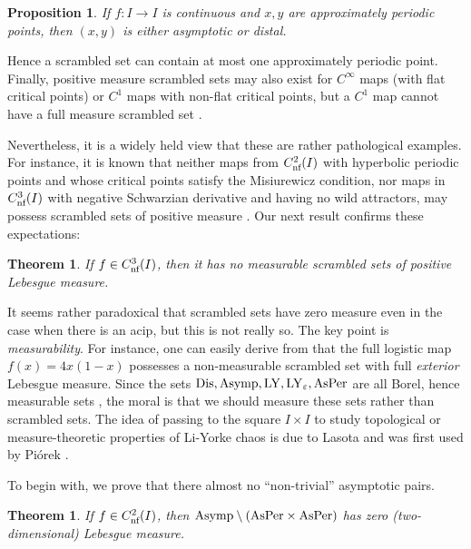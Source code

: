 \documentclass[12pt, psamsfonts, reqno]{amsart}
\newcounter{letter}
\newtheorem{maintheorem}[letter]{Theorem}
\newtheorem{proposition}[theorem]{Proposition}
\begin{document}
\begin{proposition}\label{prop:approximately}
If $f:I\to I$ is continuous and $x,y$ are approximately periodic
 points, then $(x,y)$ is either asymptotic or distal.
\end{proposition}

\noindent Hence a scrambled set can contain at most one
approximately periodic point. Finally, positive measure scrambled
sets may also exist for $C^\infty$ maps (with flat critical
points) or $C^1$ maps with non-flat critical points, but a $C^1$
map cannot have a full measure scrambled set \cite{Jim1, Jim2,
BaJi2}.

Nevertheless, it is a widely held view that
these are rather pathological examples. For instance, it is known
that neither maps from ${C^2_{\text{\rm nf}}}(I)$ with hyperbolic periodic points
and whose critical points satisfy the Misiurewicz condition, nor
maps in ${C^3_{\text{\rm nf}}}(I)$ with negative Schwarzian derivative and
having no wild attractors, may possess scrambled sets of positive
measure \cite{BaJi1, BrJi}. Our next result confirms these expectations:

\begin{maintheorem} \label{mainthmC2}
 If $f\in {C^3_{\text{\rm nf}}}(I)$, then it has
 no measurable scrambled sets of positive Lebesgue measure.
\end{maintheorem}

It seems rather paradoxical that scrambled sets have zero measure
even in the case when there is an acip, but this is not really so.
The key point is \emph{measurability}. For instance, one can
easily derive from \cite{Smi1} that the full logistic map
$f(x)=4x(1-x)$ possesses a non-measurable scrambled set with full
\emph{exterior} Lebesgue measure. Since the sets ${\mathop{\rm Dis}\nolimits}, {\mathop{\rm Asymp}\nolimits},
{\mathop{\rm LY}\nolimits}, {\mathop{\rm LY}\nolimits}_{\varepsilon}, {\mathop{\rm AsPer}\nolimits}$ are all Borel, hence measurable sets
\cite{Jim3, BrJi}, the moral is that we should measure these sets
rather than scrambled sets. The idea of passing to the square $I
\times I$ to study topological or measure-theoretic properties of
Li-Yorke chaos is due to Lasota and was first used by Pi\'orek
\cite{Pio}.

To begin with, we prove that there almost no ``non-trivial''
asymptotic pairs.
\begin{maintheorem} \label{mainthm:Asymp}
 If $f\in {C^2_{\text{\rm nf}}}(I)$, then ${\mathop{\rm Asymp}\nolimits} \setminus ({\mathop{\rm AsPer}\nolimits}\times {\mathop{\rm AsPer}\nolimits})$ has zero
 (two-dimensional) Lebesgue measure.
\end{maintheorem}
\end{document}
